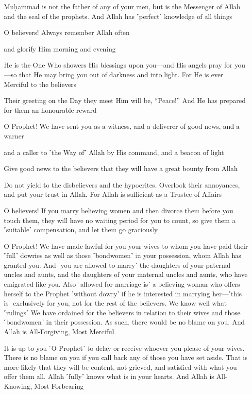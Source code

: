 Muḥammad is not the father of any of your men, but is the Messenger of Allah and the seal of the prophets. And Allah has ˹perfect˺ knowledge of all things

O believers! Always remember Allah often

and glorify Him morning and evening

He is the One Who showers His blessings upon you—and His angels pray for you—so that He may bring you out of darkness and into light. For He is ever Merciful to the believers

Their greeting on the Day they meet Him will be, “Peace!” And He has prepared for them an honourable reward

O Prophet! We have sent you as a witness, and a deliverer of good news, and a warner

and a caller to ˹the Way of˺ Allah by His command, and a beacon of light

Give good news to the believers that they will have a great bounty from Allah

Do not yield to the disbelievers and the hypocrites. Overlook their annoyances, and put your trust in Allah. For Allah is sufficient as a Trustee of Affairs

O believers! If you marry believing women and then divorce them before you touch them, they will have no waiting period for you to count, so give them a ˹suitable˺ compensation, and let them go graciously

O Prophet! We have made lawful for you your wives to whom you have paid their ˹full˺ dowries as well as those ˹bondwomen˺ in your possession, whom Allah has granted you. And ˹you are allowed to marry˺ the daughters of your paternal uncles and aunts, and the daughters of your maternal uncles and aunts, who have emigrated like you. Also ˹allowed for marriage is˺ a believing woman who offers herself to the Prophet ˹without dowry˺ if he is interested in marrying her—˹this is˺ exclusively for you, not for the rest of the believers. We know well what ˹rulings˺ We have ordained for the believers in relation to their wives and those ˹bondwomen˺ in their possession. As such, there would be no blame on you. And Allah is All-Forgiving, Most Merciful

It is up to you ˹O Prophet˺ to delay or receive whoever you please of your wives. There is no blame on you if you call back any of those you have set aside. That is more likely that they will be content, not grieved, and satisfied with what you offer them all. Allah ˹fully˺ knows what is in your hearts. And Allah is All-Knowing, Most Forbearing


